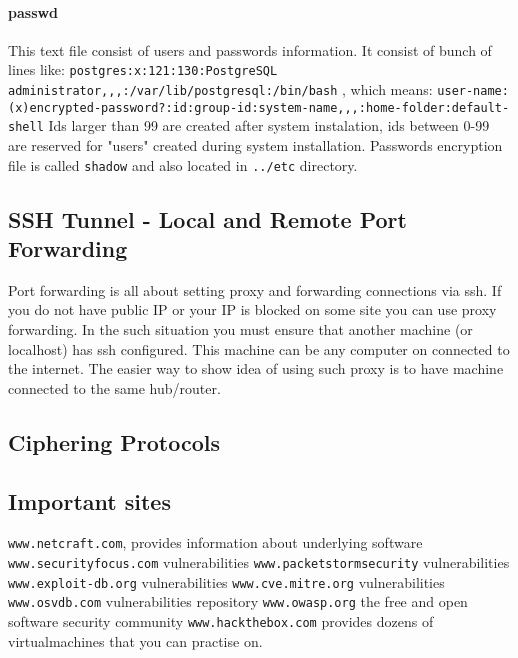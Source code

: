 \documentclass{article}[12pt]
\begin{document}
\paragraph{passwd} This text file consist of users and passwords information. It consist of bunch of lines like: \newline
\texttt{postgres:x:121:130:PostgreSQL administrator,,,:/var/lib/postgresql:/bin/bash} , which means:
\texttt{user-name:(x)encrypted-password?:id:group-id:system-name,,,:home-folder:default-shell} \newline
Ids larger than 99 are created after system instalation, ids between 0-99 are reserved for "users" created during system installation. Passwords encryption file is called \texttt{shadow} and also located in \texttt{../etc} directory.





\subsection{SSH Tunnel - Local and Remote Port Forwarding}

Port forwarding is all about setting proxy and forwarding connections via ssh. If you do not have public IP or your IP is blocked on some site you can use proxy forwarding. In the such situation you must ensure that another machine (or localhost) has ssh configured. This machine can be any computer on connected to the internet. The easier way to show idea of using such proxy is to have machine connected to the same hub/router.




\subsection{Ciphering Protocols}





\subsection{Important sites}
\texttt{www.netcraft.com}, provides information about underlying software
\texttt{www.securityfocus.com} vulnerabilities
\texttt{www.packetstormsecurity} vulnerabilities
\texttt{www.exploit-db.org} vulnerabilities
\texttt{www.cve.mitre.org} vulnerabilities
\texttt{www.osvdb.com} vulnerabilities repository
\texttt{www.owasp.org} the free and open software security community
\texttt{www.hackthebox.com} provides dozens of virtualmachines that you can practise on.
\texttt{}
\texttt{}
\texttt{}
\end{document}
